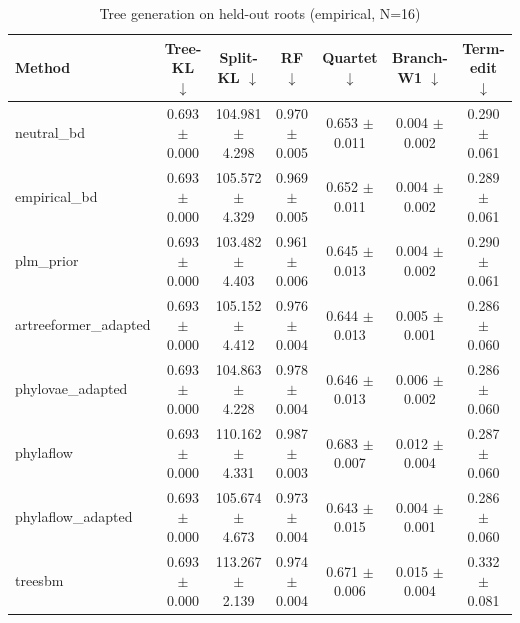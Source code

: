 \begin{table}[t]\centering
\caption{Tree generation on held-out roots (empirical, N=16)}
\begin{tabular}{lcccccc}
\toprule
Method & Tree-KL $\downarrow$ & Split-KL $\downarrow$ & RF $\downarrow$ & Quartet $\downarrow$ & Branch-W1 $\downarrow$ & Term-edit $\downarrow$ \\
\midrule
neutral\_bd & 0.693 $\pm$ 0.000 & 104.981 $\pm$ 4.298 & 0.970 $\pm$ 0.005 & 0.653 $\pm$ 0.011 & 0.004 $\pm$ 0.002 & 0.290 $\pm$ 0.061 \\
empirical\_bd & 0.693 $\pm$ 0.000 & 105.572 $\pm$ 4.329 & 0.969 $\pm$ 0.005 & 0.652 $\pm$ 0.011 & 0.004 $\pm$ 0.002 & 0.289 $\pm$ 0.061 \\
plm\_prior & 0.693 $\pm$ 0.000 & 103.482 $\pm$ 4.403 & 0.961 $\pm$ 0.006 & 0.645 $\pm$ 0.013 & 0.004 $\pm$ 0.002 & 0.290 $\pm$ 0.061 \\
artreeformer\_adapted & 0.693 $\pm$ 0.000 & 105.152 $\pm$ 4.412 & 0.976 $\pm$ 0.004 & 0.644 $\pm$ 0.013 & 0.005 $\pm$ 0.001 & 0.286 $\pm$ 0.060 \\
phylovae\_adapted & 0.693 $\pm$ 0.000 & 104.863 $\pm$ 4.228 & 0.978 $\pm$ 0.004 & 0.646 $\pm$ 0.013 & 0.006 $\pm$ 0.002 & 0.286 $\pm$ 0.060 \\
phylaflow & 0.693 $\pm$ 0.000 & 110.162 $\pm$ 4.331 & 0.987 $\pm$ 0.003 & 0.683 $\pm$ 0.007 & 0.012 $\pm$ 0.004 & 0.287 $\pm$ 0.060 \\
phylaflow\_adapted & 0.693 $\pm$ 0.000 & 105.674 $\pm$ 4.673 & 0.973 $\pm$ 0.004 & 0.643 $\pm$ 0.015 & 0.004 $\pm$ 0.001 & 0.286 $\pm$ 0.060 \\
treesbm & 0.693 $\pm$ 0.000 & 113.267 $\pm$ 2.139 & 0.974 $\pm$ 0.004 & 0.671 $\pm$ 0.006 & 0.015 $\pm$ 0.004 & 0.332 $\pm$ 0.081 \\
\bottomrule
\end{tabular}
\end{table}